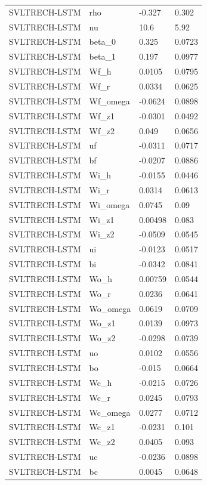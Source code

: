\begin{table}[htbp]
\begin{tabular}{llll}
SVLTRECH-LSTM & rho & -0.327 & 0.302 \\
SVLTRECH-LSTM & nu & 10.6 & 5.92 \\
SVLTRECH-LSTM & beta\_0 & 0.325 & 0.0723 \\
SVLTRECH-LSTM & beta\_1 & 0.197 & 0.0977 \\
SVLTRECH-LSTM & Wf\_h & 0.0105 & 0.0795 \\
SVLTRECH-LSTM & Wf\_r & 0.0334 & 0.0625 \\
SVLTRECH-LSTM & Wf\_omega & -0.0624 & 0.0898 \\
SVLTRECH-LSTM & Wf\_z1 & -0.0301 & 0.0492 \\
SVLTRECH-LSTM & Wf\_z2 & 0.049 & 0.0656 \\
SVLTRECH-LSTM & uf & -0.0311 & 0.0717 \\
SVLTRECH-LSTM & bf & -0.0207 & 0.0886 \\
SVLTRECH-LSTM & Wi\_h & -0.0155 & 0.0446 \\
SVLTRECH-LSTM & Wi\_r & 0.0314 & 0.0613 \\
SVLTRECH-LSTM & Wi\_omega & 0.0745 & 0.09 \\
SVLTRECH-LSTM & Wi\_z1 & 0.00498 & 0.083 \\
SVLTRECH-LSTM & Wi\_z2 & -0.0509 & 0.0545 \\
SVLTRECH-LSTM & ui & -0.0123 & 0.0517 \\
SVLTRECH-LSTM & bi & -0.0342 & 0.0841 \\
SVLTRECH-LSTM & Wo\_h & 0.00759 & 0.0544 \\
SVLTRECH-LSTM & Wo\_r & 0.0236 & 0.0641 \\
SVLTRECH-LSTM & Wo\_omega & 0.0619 & 0.0709 \\
SVLTRECH-LSTM & Wo\_z1 & 0.0139 & 0.0973 \\
SVLTRECH-LSTM & Wo\_z2 & -0.0298 & 0.0739 \\
SVLTRECH-LSTM & uo & 0.0102 & 0.0556 \\
SVLTRECH-LSTM & bo & -0.015 & 0.0664 \\
SVLTRECH-LSTM & Wc\_h & -0.0215 & 0.0726 \\
SVLTRECH-LSTM & Wc\_r & 0.0245 & 0.0793 \\
SVLTRECH-LSTM & Wc\_omega & 0.0277 & 0.0712 \\
SVLTRECH-LSTM & Wc\_z1 & -0.0231 & 0.101 \\
SVLTRECH-LSTM & Wc\_z2 & 0.0405 & 0.093 \\
SVLTRECH-LSTM & uc & -0.0236 & 0.0898 \\
SVLTRECH-LSTM & bc & 0.0045 & 0.0648 \\

\end{tabular}
\end{table}
